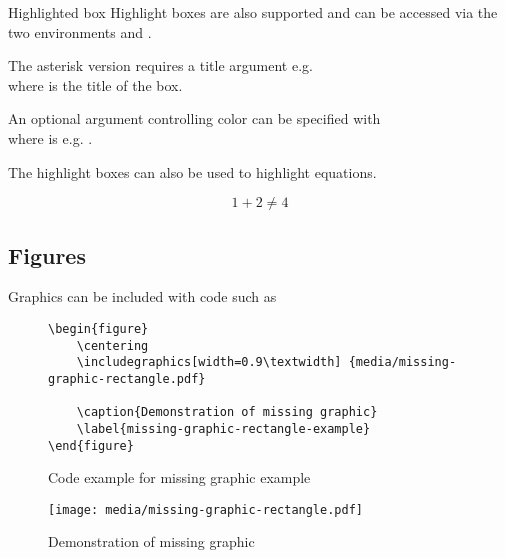 \begin{highlightbox*}{Highlighted box}
    Highlight boxes are also supported and can be accessed via the two environments
     and . 

    The asterisk version requires a title argument e.g.\\
    where  is the title of the box.

    An optional argument controlling color can be specified with\\
     where  is e.g. .
\end{highlightbox*}

The highlight boxes can also be used to highlight equations.
\begin{highlightbox}
\begin{equation}
    1+2\neq 4
\end{equation}
\end{highlightbox}


\subsection{Figures}
Graphics can be included with code such as
\begin{figure}
    \centering
    \begin{lstlisting}
\begin{figure}
    \centering
    \includegraphics[width=0.9\textwidth] {media/missing-graphic-rectangle.pdf}

    \caption{Demonstration of missing graphic}
    \label{missing-graphic-rectangle-example}
\end{figure}
    \end{lstlisting}

    \caption{Code example for missing graphic example}
    \label{code-missing-graphic-rectangle-example}
\end{figure}


\begin{figure}
    \centering
    \texttt{[image: media/missing-graphic-rectangle.pdf]}

    \caption{Demonstration of missing graphic}
    \label{missing-graphic-rectangle-example}
\end{figure}

